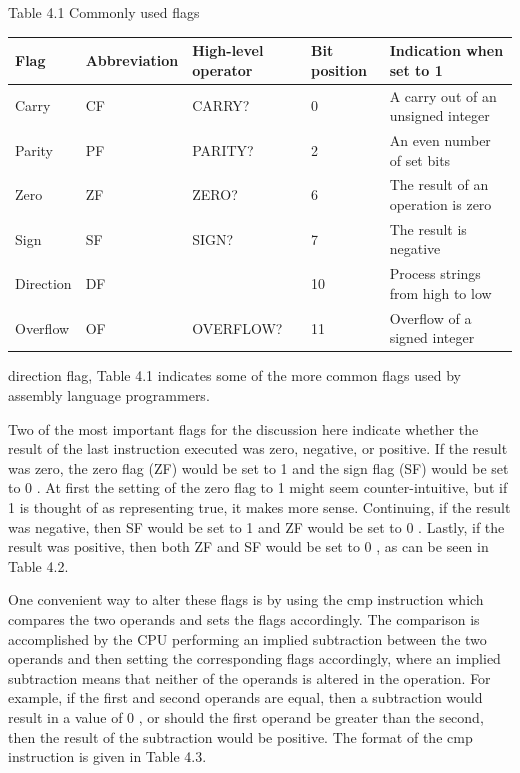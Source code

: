 \documentclass[10pt]{book}
\begin{document}
Table 4.1 Commonly used flags

\begin{center}
\begin{tabular}{|l|l|l|l|l|}
\hline
Flag & Abbreviation & High-level operator & Bit position & Indication when set to 1 \\
\hline
Carry & CF & CARRY? & 0 & A carry out of an unsigned integer \\
\hline
Parity & PF & PARITY? & 2 & An even number of set bits \\
\hline
Zero & ZF & ZERO? & 6 & The result of an operation is zero \\
\hline
Sign & SF & SIGN? & 7 & The result is negative \\
\hline
Direction & DF &  & 10 & Process strings from high to low \\
\hline
Overflow & OF & OVERFLOW? & 11 & Overflow of a signed integer \\
\hline
\end{tabular}
\end{center}

direction flag, Table 4.1 indicates some of the more common flags used by assembly language programmers.

Two of the most important flags for the discussion here indicate whether the result of the last instruction executed was zero, negative, or positive. If the result was zero, the zero flag (ZF) would be set to 1 and the sign flag (SF) would be set to 0 . At first the setting of the zero flag to 1 might seem counter-intuitive, but if 1 is thought of as representing true, it makes more sense. Continuing, if the result was negative, then SF would be set to 1 and ZF would be set to 0 . Lastly, if the result was positive, then both ZF and SF would be set to 0 , as can be seen in Table 4.2.

One convenient way to alter these flags is by using the cmp instruction which compares the two operands and sets the flags accordingly. The comparison is accomplished by the CPU performing an implied subtraction between the two operands and then setting the corresponding flags accordingly, where an implied subtraction means that neither of the operands is altered in the operation. For example, if the first and second operands are equal, then a subtraction would result in a value of 0 , or should the first operand be greater than the second, then the result of the subtraction would be positive. The format of the cmp instruction is given in Table 4.3.
\end{document}
